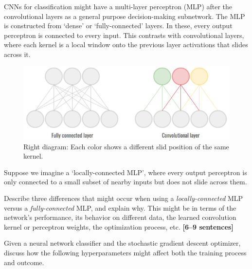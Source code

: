 \documentclass{csci1430}
\begin{document}
\pagebreak
\begin{question}[points=6,drawbox=false] 
CNNs for classification might have a multi-layer perceptron (MLP) after the convolutional layers as a general purpose decision-making subnetwork. The MLP is constructed from `dense' or `fully-connected' layers. In these, every output perceptron is connected to every input. This contrasts with convolutional layers, where each kernel is a local window onto the previous layer activations that slides across it.

\begin{figure}[h]
\includegraphics[width=\linewidth]{images/q2mlp.png}
\caption{Right diagram: Each color shows a different slid position of the same kernel.}
\end{figure}

Suppose we imagine a `locally-connected MLP', where every output perceptron is only connected to a small subset of nearby inputs but does not slide across them.
\end{question}

\begin{orangebox}
Describe three differences that might occur when using a \emph{locally-connected} MLP versus a \emph{fully-connected} MLP, and explain why.
This might be in terms of the network's performance, its behavior on different data, the learned convolution kernel or perceptron weights, the optimization process, etc. \textbf{[6--9 sentences]}
\end{orangebox}

\begin{answer}[height=17]

\end{answer}


\pagebreak
\begin{question}[points=6,drawbox=false]
Given a neural network classifier and the stochastic gradient descent optimizer, discuss how the following hyperparameters might affect both the training process and outcome.
\end{question}
\end{document}
